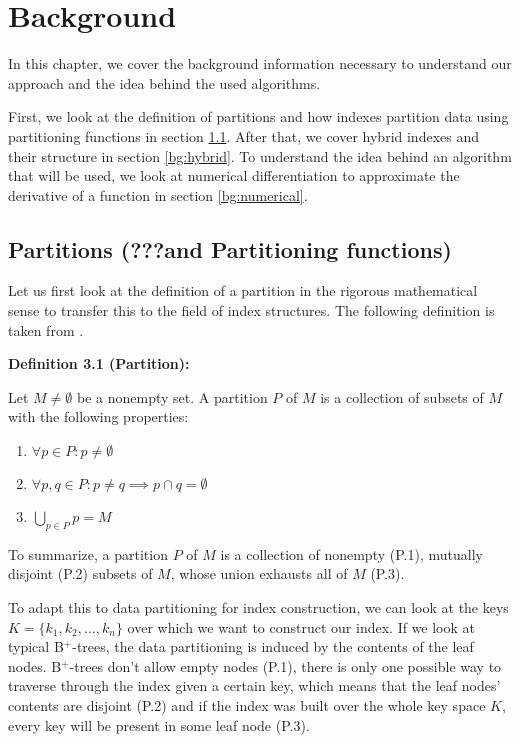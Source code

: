 \thispagestyle{plain}
\chapter{Background}

In this chapter, we cover the background information necessary to understand our approach and the idea behind the used algorithms.

First, we look at the definition of partitions and how indexes partition data using partitioning functions in section \ref{bg:partitions}. After that, we cover hybrid indexes and their structure in section \ref{bg:hybrid}. To understand the idea behind an algorithm that will be used, we look at numerical differentiation to approximate the derivative of a function in section \ref{bg:numerical}.

\section{Partitions (???and Partitioning functions)}\label{bg:partitions}
Let us first look at the definition of a partition in the rigorous mathematical sense to transfer this to the field of index structures. The following definition is taken from \citeauthor{Lucas1990} \cite{Lucas1990}.

\vspace{0.5cm}
\noindent \textbf{Definition 3.1 (Partition):}

\noindent Let $M \neq \emptyset$ be a nonempty set. A partition $P$ of $M$ is a collection of subsets of $M$ with the following properties:

\begin{enumerate}
    \item[P.1] $\forall p \in P: p \neq \emptyset$
    \item[P.2] $\forall p,q \in P: p \neq q \implies p \cap q = \emptyset$
    \item[P.3] $\bigcup_{p \in P} p = M$
\end{enumerate}

\noindent To summarize, a partition $P$ of $M$ is a collection of nonempty (P.1), mutually disjoint (P.2) subsets of $M$, whose union exhausts all of $M$ (P.3).

\vspace{0.5cm}
To adapt this to data partitioning for index construction, we can look at the keys $K = \{k_1, k_2, ..., k_n\}$ over which we want to construct our index. If we look at typical B$^+$-trees, the data partitioning is induced by the contents of the leaf nodes. B$^+$-trees don't allow empty nodes (P.1), there is only one possible way to traverse through the index given a certain key, which means that the leaf nodes' contents are disjoint (P.2) and if the index was built over the whole key space $K$, every key will be present in some leaf node (P.3). 

